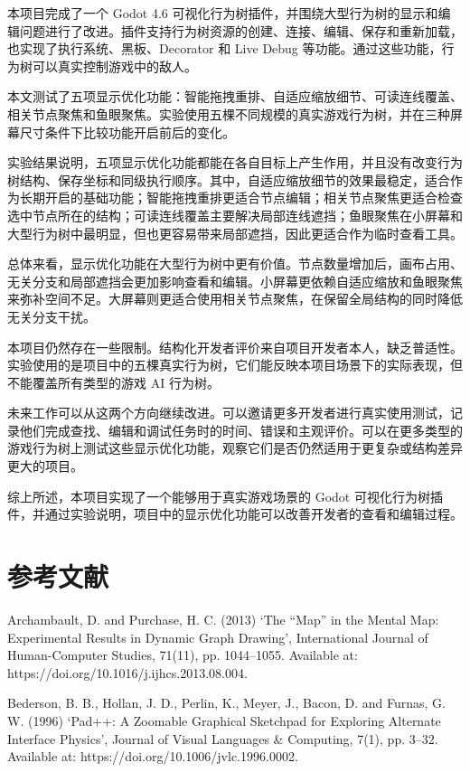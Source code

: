 \documentclass[11pt,a4paper,oneside,extrafontsizes]{memoir}
\begin{document}
本项目完成了一个 Godot 4.6 可视化行为树插件，并围绕大型行为树的显示和编辑问题进行了改进。插件支持行为树资源的创建、连接、编辑、保存和重新加载，也实现了执行系统、黑板、Decorator 和 Live Debug 等功能。通过这些功能，行为树可以真实控制游戏中的敌人。

本文测试了五项显示优化功能：智能拖拽重排、自适应缩放细节、可读连线覆盖、相关节点聚焦和鱼眼聚焦。实验使用五棵不同规模的真实游戏行为树，并在三种屏幕尺寸条件下比较功能开启前后的变化。

实验结果说明，五项显示优化功能都能在各自目标上产生作用，并且没有改变行为树结构、保存坐标和同级执行顺序。其中，自适应缩放细节的效果最稳定，适合作为长期开启的基础功能；智能拖拽重排更适合节点编辑；相关节点聚焦更适合检查选中节点所在的结构；可读连线覆盖主要解决局部连线遮挡；鱼眼聚焦在小屏幕和大型行为树中最明显，但也更容易带来局部遮挡，因此更适合作为临时查看工具。

总体来看，显示优化功能在大型行为树中更有价值。节点数量增加后，画布占用、无关分支和局部遮挡会更加影响查看和编辑。小屏幕更依赖自适应缩放和鱼眼聚焦来弥补空间不足。大屏幕则更适合使用相关节点聚焦，在保留全局结构的同时降低无关分支干扰。

本项目仍然存在一些限制。结构化开发者评价来自项目开发者本人，缺乏普适性。实验使用的是项目中的五棵真实行为树，它们能反映本项目场景下的实际表现，但不能覆盖所有类型的游戏 AI 行为树。

未来工作可以从这两个方向继续改进。可以邀请更多开发者进行真实使用测试，记录他们完成查找、编辑和调试任务时的时间、错误和主观评价。可以在更多类型的游戏行为树上测试这些显示优化功能，观察它们是否仍然适用于更复杂或结构差异更大的项目。

综上所述，本项目实现了一个能够用于真实游戏场景的 Godot 可视化行为树插件，并通过实验说明，项目中的显示优化功能可以改善开发者的查看和编辑过程。

\chapter*{参考文献}

Archambault, D. and Purchase, H. C. (2013) ‘The “Map” in the Mental Map: Experimental Results in Dynamic Graph Drawing’, International Journal of Human-Computer Studies, 71(11), pp. 1044–1055. Available at: https://doi.org/10.1016/j.ijhcs.2013.08.004.

Bederson, B. B., Hollan, J. D., Perlin, K., Meyer, J., Bacon, D. and Furnas, G. W. (1996) ‘Pad++: A Zoomable Graphical Sketchpad for Exploring Alternate Interface Physics’, Journal of Visual Languages \& Computing, 7(1), pp. 3–32. Available at: https://doi.org/10.1006/jvlc.1996.0002.
\end{document}
